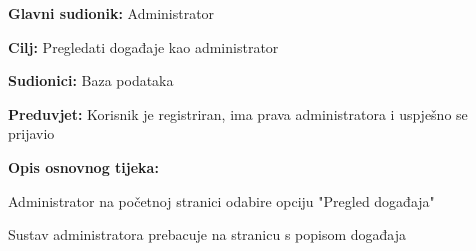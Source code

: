 \noindent {}
\begin{packed_item}
	\item \textbf{Glavni sudionik:} Administrator
	\item  \textbf{Cilj:} Pregledati događaje kao administrator
	\item  \textbf{Sudionici:} Baza podataka
	\item  \textbf{Preduvjet:} Korisnik je registriran, ima prava administratora i uspješno se prijavio
	\item  \textbf{Opis osnovnog tijeka:}
	
	\item[] \begin{packed_enum}
		
		\item Administrator na početnoj stranici odabire opciju "Pregled događaja"
		\item Sustav administratora prebacuje na stranicu s popisom događaja
	\end{packed_enum}
	
\end{packed_item}


